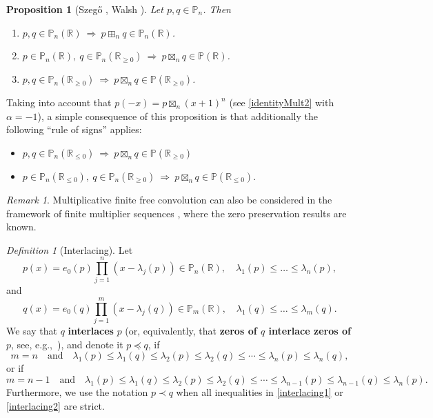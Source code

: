 \documentclass[reqno,11pt]{amsart}
\newtheorem{proposition}[theorem]{Proposition}
\theoremstyle{remark}
\newtheorem{remark}[theorem]{Remark}
\newtheorem{definition}[theorem]{Definition}
\renewcommand{\P}{\mathbb{P}}
\newcommand{\R}{\mathbb{R}}
\newcommand{\rr}{\mathbb{R}}
\begin{document}
\begin{proposition}[Szeg\H{o} \cite{szego1922}, Walsh \cite{Walsh1922}]
    \label{prop:realrootedness}
    Let $p, q \in \P_n$. Then
    \begin{enumerate}
        \item[(i)]  $p,q\in \P_n(\rr) \ \Rightarrow \ p\boxplus_n q\in \P_n(\rr)$.
        \item[(ii)] $p\in \P_n(\rr),\ q\in \P_n(\rr_{\geq 0}) \ \Rightarrow \ p\boxtimes_n q\in \P(\rr)$.
        \item[(iii)] $p,q\in \P_n(\rr_{\geq 0}) \ \Rightarrow \ p\boxtimes_n q\in \P(\rr_{\geq 0})$.
    \end{enumerate}
\end{proposition}
Taking into account that $p(-x)=p\boxtimes_n(x+1)^n$ (see \eqref{identityMult2} with $\alpha=-1$), a simple consequence of this proposition is that additionally the following ``rule of signs'' applies:
\begin{itemize}
\item $p,q\in \P_n(\rr_{\leq 0}) \ \Rightarrow \ p\boxtimes_n q\in \P(\rr_{\geq 0})$

\item $p\in \P_n(\rr_{\leq 0}),\ q\in \P_n(\rr_{\geq 0}) \ \Rightarrow \ p\boxtimes_n q\in \P(\rr_{\leq 0})$.
\end{itemize}
\begin{remark}
Multiplicative finite free convolution can also be considered in the framework of finite multiplier sequences \cite{MR1483603, MR0568321, MR2242036}, where the zero preservation results are known.
\end{remark}

\begin{definition}[Interlacing] 
Let
$$
p(x)=e_0(p)\prod_{j=1}^n \left(x-\lambda_j(p)\right) \in \P_n(\R), \quad \lambda_1(p) \leq \dots \leq \lambda_n(p),
$$
and 
$$
q(x)=e_0(q)\prod_{j=1}^m \left(x-\lambda_j(q)\right) \in \P_m(\R), \quad \lambda_1(q) \leq \dots \leq \lambda_m(q).
$$
We say that $q$ \textbf{interlaces} $p$ (or, equivalently, that \textbf{zeros of $q$ interlace zeros of $p$}, see, e.g.,~\cite{MR3051099}), and denote it $p \preccurlyeq q$, if 
\begin{equation} \label{interlacing1}
    m=n \quad \text{and} \quad \lambda_1(p) \leq \lambda_1(q) \leq \lambda_2(p) \leq \lambda_2(q) \leq \cdots \leq  \lambda_n(p) \leq \lambda_n(q),
\end{equation}
or if
\begin{equation} \label{interlacing2}
    m=n-1 \quad \text{and} \quad \lambda_1(p) \leq \lambda_1(q) \leq \lambda_2(p) \leq \lambda_2(q) \leq \cdots \leq  \lambda_{n-1}(p) \leq \lambda_{n-1}(q) \le \lambda_n(p).
\end{equation}
Furthermore, we use the notation $p \prec q$ when all inequalities in \eqref{interlacing1} or \eqref{interlacing2} are strict.
\end{definition}
\end{document}

